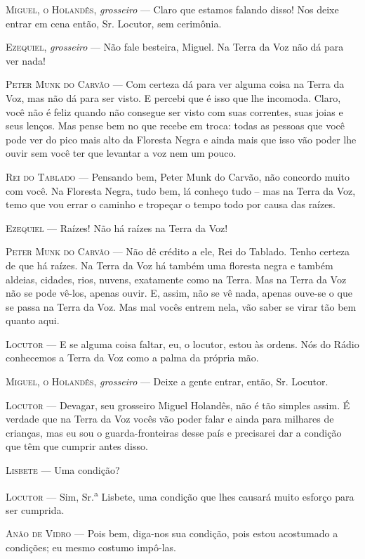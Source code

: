 \textsc{Miguel, o Holandês}, \emph{grosseiro} --- Claro que estamos falando disso!
Nos deixe entrar em cena então, Sr. Locutor, sem cerimônia.

\textsc{Ezequiel}, \emph{grosseiro} --- Não fale besteira, Miguel. Na Terra da Voz
não dá para ver nada!

\textsc{Peter Munk do Carvão} --- Com certeza dá para ver alguma coisa na Terra da
Voz, mas não dá para ser visto. E percebi que é isso que lhe incomoda.
Claro, você não é feliz quando não consegue ser visto com suas
correntes, suas joias e seus lenços. Mas pense bem no que recebe em
troca: todas as pessoas que você pode ver do pico mais alto da Floresta
Negra e ainda mais que isso vão poder lhe ouvir sem você ter que
levantar a voz nem um pouco.

\textsc{Rei do Tablado} --- Pensando bem, Peter Munk do Carvão, não concordo muito
com você. Na Floresta Negra, tudo bem, lá conheço tudo -- mas na Terra
da Voz, temo que vou errar o caminho e tropeçar o tempo todo por causa
das raízes.

\textsc{Ezequiel} --- Raízes! Não há raízes na Terra da Voz!

\textsc{Peter Munk do Carvão} --- Não dê crédito a ele, Rei do Tablado. Tenho
certeza de que há raízes. Na Terra da Voz há também uma floresta negra e
também aldeias, cidades, rios, nuvens, exatamente como na Terra. Mas na
Terra da Voz não se pode vê-los, apenas ouvir. E, assim, não se vê nada,
apenas ouve-se o que se passa na Terra da Voz. Mas mal vocês entrem
nela, vão saber se virar tão bem quanto aqui.

\textsc{Locutor} --- E se alguma coisa faltar, eu, o locutor, estou às ordens. Nós
do Rádio conhecemos a Terra da Voz como a palma da própria mão.

\textsc{Miguel, o Holandês}, \emph{grosseiro} --- Deixe a gente entrar, então, Sr.
Locutor.

\textsc{Locutor} --- Devagar, seu grosseiro Miguel Holandês, não é tão simples
assim. É verdade que na Terra da Voz vocês vão poder falar e ainda para
milhares de crianças, mas eu sou o guarda-fronteiras desse país e
precisarei dar a condição que têm que cumprir antes disso.

\textsc{Lisbete} --- Uma condição?

\textsc{Locutor} --- Sim, Sr.\textsuperscript{a} Lisbete, uma condição que lhes
causará muito esforço para ser cumprida.

\textsc{Anão de Vidro} --- Pois bem, diga-nos sua condição, pois estou acostumado
a condições; eu mesmo costumo impô-las.

